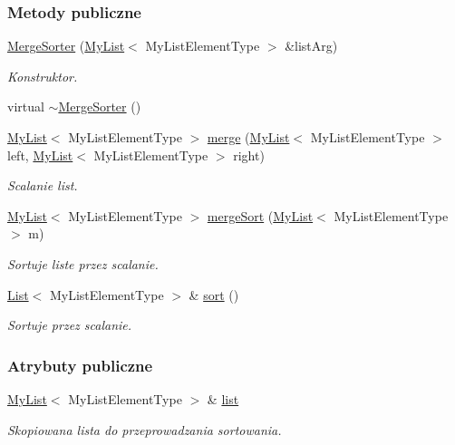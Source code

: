 \subsubsection*{Metody publiczne}
\begin{DoxyCompactItemize}
\item 
\hyperlink{class_merge_sorter_a0ffb06429d7ebcb8bd007ca5db53429f}{Merge\-Sorter} (\hyperlink{class_my_list}{My\-List}$<$ My\-List\-Element\-Type $>$ \&list\-Arg)
\begin{DoxyCompactList}\small\item\em Konstruktor. \end{DoxyCompactList}\item 
virtual \hyperlink{class_merge_sorter_aa3e8fe75440511195aaf6dd7ef9dfcf1}{$\sim$\-Merge\-Sorter} ()
\item 
\hyperlink{class_my_list}{My\-List}$<$ My\-List\-Element\-Type $>$ \hyperlink{class_merge_sorter_a9cde12ce9803e379ab421bf377103ba0}{merge} (\hyperlink{class_my_list}{My\-List}$<$ My\-List\-Element\-Type $>$ left, \hyperlink{class_my_list}{My\-List}$<$ My\-List\-Element\-Type $>$ right)
\begin{DoxyCompactList}\small\item\em Scalanie list. \end{DoxyCompactList}\item 
\hyperlink{class_my_list}{My\-List}$<$ My\-List\-Element\-Type $>$ \hyperlink{class_merge_sorter_ab945fd9934a6f47a851b40b23d18ee71}{merge\-Sort} (\hyperlink{class_my_list}{My\-List}$<$ My\-List\-Element\-Type $>$ m)
\begin{DoxyCompactList}\small\item\em Sortuje liste przez scalanie. \end{DoxyCompactList}\item 
\hyperlink{class_list}{List}$<$ My\-List\-Element\-Type $>$ \& \hyperlink{class_merge_sorter_aaee4333eb37af6401eca60da3398e507}{sort} ()
\begin{DoxyCompactList}\small\item\em Sortuje przez scalanie. \end{DoxyCompactList}\end{DoxyCompactItemize}
\subsubsection*{Atrybuty publiczne}
\begin{DoxyCompactItemize}
\item 
\hyperlink{class_my_list}{My\-List}$<$ My\-List\-Element\-Type $>$ \& \hyperlink{class_merge_sorter_a8ac3ee938414809d7da627cf918f1f87}{list}
\begin{DoxyCompactList}\small\item\em Skopiowana lista do przeprowadzania sortowania. \end{DoxyCompactList}\end{DoxyCompactItemize}


